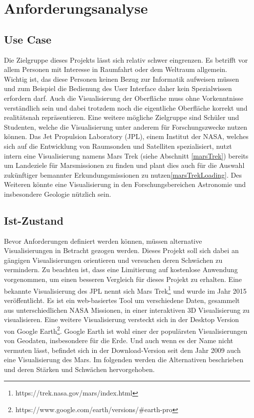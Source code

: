 \chapter{Anforderungsanalyse}

\section{Use Case}
Die Zielgruppe dieses Projekts lässt sich relativ schwer eingrenzen. Es betrifft vor allem Personen mit Interesse in Raumfahrt oder dem Weltraum allgemein. Wichtig ist, das diese Personen keinen Bezug zur Informatik aufweisen müssen und zum Beispiel die Bedienung des User Interface daher kein Spezialwissen erfordern darf. Auch die Visualisierung der Oberfläche muss ohne Vorkenntnisse verständlich sein und dabei trotzdem noch die eigentliche Oberfläche korrekt und realitätsnah repräsentieren. Eine weitere mögliche Zielgruppe sind Schüler und Studenten, welche die Visualisierung unter anderem für Forschungszwecke nutzen können. Das Jet Propulsion Laboratory (JPL), einem Institut der NASA, welches sich auf die Entwicklung von Raumsonden und Satelliten spezialisiert, nutzt intern eine Visualisierung namens Mars Trek (siehe Abschnitt \ref{marsTrek}) bereits um Landeziele für Marsmissionen zu finden und plant dies auch für die Auswahl zukünftiger bemannter Erkundungsmissionen zu nutzen\ref{marsTrekLoading}. Des Weiteren könnte eine Visualisierung in den Forschungsbereichen Astronomie und insbesondere Geologie nützlich sein.

\section{Ist-Zustand}\label{istZustand}
Bevor Anforderungen definiert werden können, müssen alternative Visualisierungen in Betracht gezogen werden. Dieses Projekt soll sich dabei an gängigen Visualisierungen orientieren und versuchen deren Schwächen zu vermindern. Zu beachten ist, dass eine Limitierung auf kostenlose Anwendung vorgenommen, um einen besseren Vergleich für dieses Projekt zu erhalten. Eine bekannte Visualisierung des JPL nennt sich Mars Trek\footnote{https://trek.nasa.gov/mars/index.html} und wurde im Jahr 2015 veröffentlicht. Es ist ein web-basiertes Tool um verschiedene Daten, gesammelt aus unterschiedlichen NASA Missionen, in einer interaktiven 3D Visualisierung zu visualisieren. Eine weitere Visualisierung versteckt sich in der Desktop Version von Google Earth\footnote{https://www.google.com/earth/versions/\#earth-pro}. Google Earth ist wohl einer der populärsten Visualisierungen von Geodaten, insbesondere für die Erde. Und auch wenn es der Name nicht vermuten lässt, befindet sich in der Download-Version seit dem Jahr 2009 auch eine Visualisierung des Mars. Im folgenden werden die Alternativen beschrieben und deren Stärken und Schwächen hervorgehoben.


